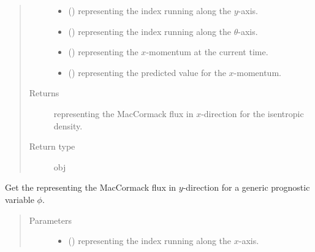 \documentclass[letterpaper,10pt,english]{sphinxmanual}
\begin{document}
\begin{fulllineitems}
\begin{fulllineitems}
\begin{quote}
\begin{description}
\begin{itemize}
\item {} 
 () \textendash{}  representing the index running along the \(y\)-axis.

\item {} 
 () \textendash{}  representing the index running along the \(\theta\)-axis.

\item {} 
 () \textendash{}  representing the \(x\)-momentum at the current time.

\item {} 
 () \textendash{}  representing the predicted value for the \(x\)-momentum.

\end{itemize}

\item[{Returns}] \leavevmode
{} representing the MacCormack flux in \(x\)-direction for the isentropic density.

\item[{Return type}] \leavevmode
obj

\end{description}\end{quote}

\end{fulllineitems}


\begin{fulllineitems}
\label{\detokenize{api:tasmania.dycore.flux_isentropic_maccormack.FluxIsentropicMacCormack._get_maccormack_flux_y}}
Get the  representing the MacCormack flux in \(y\)-direction
for a generic prognostic variable \(\phi\).
\begin{quote}\begin{description}
\item[{Parameters}] \leavevmode\begin{itemize}
\item {} 
 () \textendash{}  representing the index running along the \(x\)-axis.


\end{itemize}
\end{description}
\end{quote}
\end{fulllineitems}
\end{fulllineitems}
\end{document}
